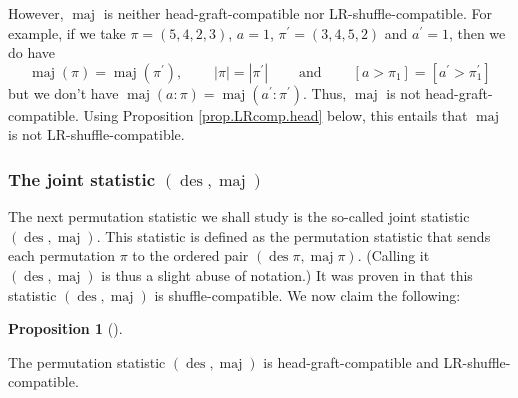 \documentclass[numbers=enddot,12pt,final,onecolumn,notitlepage]{scrartcl}%
\theoremstyle{definition}
\newtheorem{prop}[theo]{Proposition}
\newenvironment{proposition}[1][]
{\begin{prop}[#1]\begin{leftbar}}
{\end{leftbar}\end{prop}}
\begin{document}
However, $\operatorname*{maj}$ is neither head-graft-compatible nor
LR-shuffle-compatible. For example, if we take $\pi=\left(  5,4,2,3\right)  $,
$a=1$, $\pi^{\prime}=\left(  3,4,5,2\right)  $ and $a^{\prime}=1$, then we do
have%
\[
\operatorname*{maj}\left(  \pi\right)  =\operatorname*{maj}\left(  \pi
^{\prime}\right)  ,\ \ \ \ \ \ \ \ \ \ \left\vert \pi\right\vert =\left\vert
\pi^{\prime}\right\vert \ \ \ \ \ \ \ \ \ \ \text{and}%
\ \ \ \ \ \ \ \ \ \ \left[  a>\pi_{1}\right]  =\left[  a^{\prime}>\pi
_{1}^{\prime}\right]
\]
but we don't have $\operatorname*{maj}\left(  a:\pi\right)
=\operatorname*{maj}\left(  a^{\prime}:\pi^{\prime}\right)  $. Thus,
$\operatorname*{maj}$ is not head-graft-compatible. Using Proposition
\ref{prop.LRcomp.head} below, this entails that $\operatorname*{maj}$ is not LR-shuffle-compatible.

\subsubsection{The joint statistic $\left(  \operatorname*{des}%
,\operatorname*{maj}\right)  $}

The next permutation statistic we shall study is the so-called joint statistic
$\left(  \operatorname*{des},\operatorname*{maj}\right)  $. This statistic is
defined as the permutation statistic that sends each permutation $\pi$ to the
ordered pair $\left(  \operatorname*{des}\pi,\operatorname*{maj}\pi\right)  $.
(Calling it $\left(  \operatorname*{des},\operatorname*{maj}\right)  $ is thus
a slight abuse of notation.) It was proven in \cite[Theorem 4.5 \textbf{(a)}%
]{part1} that this statistic $\left(  \operatorname*{des},\operatorname*{maj}%
\right)  $ is shuffle-compatible. We now claim the following:

\begin{proposition}
\label{prop.LRcomp.desmaj}The permutation statistic $\left(
\operatorname*{des},\operatorname*{maj}\right)  $ is head-graft-compatible and LR-shuffle-compatible.
\end{proposition}
\end{document}
